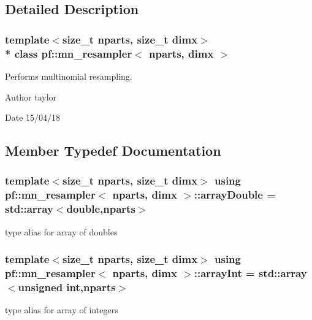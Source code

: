 \subsection{Detailed Description}
\subsubsection*{template$<$size\+\_\+t nparts, size\+\_\+t dimx$>$\\*
class pf\+::mn\+\_\+resampler$<$ nparts, dimx $>$}

Performs multinomial resampling. 

\begin{DoxyAuthor}{Author}
taylor 
\end{DoxyAuthor}
\begin{DoxyDate}{Date}
15/04/18 
\end{DoxyDate}


\subsection{Member Typedef Documentation}
\subsubsection[{\texorpdfstring{array\+Double}{arrayDouble}}]{\setlength{\rightskip}{0pt plus 5cm}template$<$size\+\_\+t nparts, size\+\_\+t dimx$>$ using {\bf pf\+::mn\+\_\+resampler}$<$ nparts, dimx $>$\+::{\bf array\+Double} =  std\+::array$<$double,nparts$>$}\hypertarget{classpf_1_1mn__resampler_a955686138dfb4b814c02eca3d1fc0fa9}{}\label{classpf_1_1mn__resampler_a955686138dfb4b814c02eca3d1fc0fa9}
type alias for array of doubles 
\subsubsection[{\texorpdfstring{array\+Int}{arrayInt}}]{\setlength{\rightskip}{0pt plus 5cm}template$<$size\+\_\+t nparts, size\+\_\+t dimx$>$ using {\bf pf\+::mn\+\_\+resampler}$<$ nparts, dimx $>$\+::{\bf array\+Int} =  std\+::array$<$unsigned int,nparts$>$}\hypertarget{classpf_1_1mn__resampler_a72e4f61199b83289d694323a05fdd1ef}{}\label{classpf_1_1mn__resampler_a72e4f61199b83289d694323a05fdd1ef}
type alias for array of integers 
